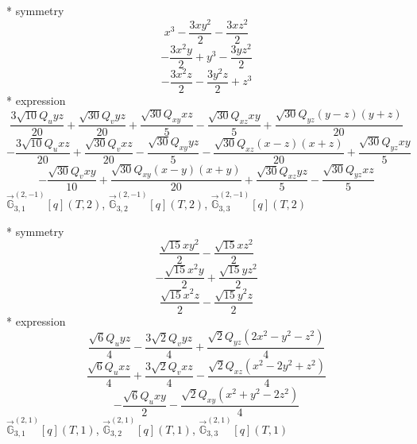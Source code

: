 \documentclass[fleqn,8pt]{jsarticle}
\begin{document}
\noindent\quad ** symmetry
\begin{dmath*}
x^{3} - \frac{3 x y^{2}}{2} - \frac{3 x z^{2}}{2}
\end{dmath*}
\begin{dmath*}
- \frac{3 x^{2} y}{2} + y^{3} - \frac{3 y z^{2}}{2}
\end{dmath*}
\begin{dmath*}
- \frac{3 x^{2} z}{2} - \frac{3 y^{2} z}{2} + z^{3}
\end{dmath*}
\noindent\quad ** expression
\begin{dmath*}
\frac{3 \sqrt{10} Q_{u} y z}{20} + \frac{\sqrt{30} Q_{v} y z}{20} + \frac{\sqrt{30} Q_{xy} x z}{5} - \frac{\sqrt{30} Q_{xz} x y}{5} + \frac{\sqrt{30} Q_{yz} \left(y - z\right) \left(y + z\right)}{20}
\end{dmath*}
\begin{dmath*}
- \frac{3 \sqrt{10} Q_{u} x z}{20} + \frac{\sqrt{30} Q_{v} x z}{20} - \frac{\sqrt{30} Q_{xy} y z}{5} - \frac{\sqrt{30} Q_{xz} \left(x - z\right) \left(x + z\right)}{20} + \frac{\sqrt{30} Q_{yz} x y}{5}
\end{dmath*}
\begin{dmath*}
- \frac{\sqrt{30} Q_{v} x y}{10} + \frac{\sqrt{30} Q_{xy} \left(x - y\right) \left(x + y\right)}{20} + \frac{\sqrt{30} Q_{xz} y z}{5} - \frac{\sqrt{30} Q_{yz} x z}{5}
\end{dmath*}
\noindent\quad $\vec{\mathbb{G}}_{3,1}^{(2,-1)}[q](T,2)$, $\vec{\mathbb{G}}_{3,2}^{(2,-1)}[q](T,2)$, $\vec{\mathbb{G}}_{3,3}^{(2,-1)}[q](T,2)$

\noindent\quad ** symmetry
\begin{dmath*}
\frac{\sqrt{15} x y^{2}}{2} - \frac{\sqrt{15} x z^{2}}{2}
\end{dmath*}
\begin{dmath*}
- \frac{\sqrt{15} x^{2} y}{2} + \frac{\sqrt{15} y z^{2}}{2}
\end{dmath*}
\begin{dmath*}
\frac{\sqrt{15} x^{2} z}{2} - \frac{\sqrt{15} y^{2} z}{2}
\end{dmath*}
\noindent\quad ** expression
\begin{dmath*}
\frac{\sqrt{6} Q_{u} y z}{4} - \frac{3 \sqrt{2} Q_{v} y z}{4} + \frac{\sqrt{2} Q_{yz} \left(2 x^{2} - y^{2} - z^{2}\right)}{4}
\end{dmath*}
\begin{dmath*}
\frac{\sqrt{6} Q_{u} x z}{4} + \frac{3 \sqrt{2} Q_{v} x z}{4} - \frac{\sqrt{2} Q_{xz} \left(x^{2} - 2 y^{2} + z^{2}\right)}{4}
\end{dmath*}
\begin{dmath*}
- \frac{\sqrt{6} Q_{u} x y}{2} - \frac{\sqrt{2} Q_{xy} \left(x^{2} + y^{2} - 2 z^{2}\right)}{4}
\end{dmath*}
\noindent\quad $\vec{\mathbb{G}}_{3,1}^{(2,1)}[q](T,1)$, $\vec{\mathbb{G}}_{3,2}^{(2,1)}[q](T,1)$, $\vec{\mathbb{G}}_{3,3}^{(2,1)}[q](T,1)$
\end{document}
